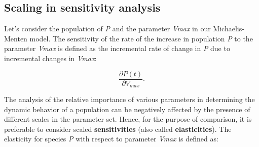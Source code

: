


\subsection{Scaling in sensitivity analysis}
\label{sec:scaling_expl}
Let's consider the population of \textit{P} and the parameter \textit{Vmax} in our Michaelis-Menten model. The sensitivity of the rate of the increase in population \textit{P} to the parameter \textit{Vmax} is defined as the incremental rate of change in \textit{P} due to incremental changes in \textit{Vmax}:

\begin{equation}
\frac{\partial P(t)}{\partial V_{max}}.
\end{equation}

The analysis of the relative importance of various parameters in determining the dynamic behavior of a population can be negatively affected by the presence of different scales in the parameter set. Hence, for the purpose of comparison, it is preferable to consider scaled \textbf{sensitivities} (also called \textbf{elasticities}). The elasticity for species \textit{P} with respect to parameter \textit{Vmax} is defined as:

